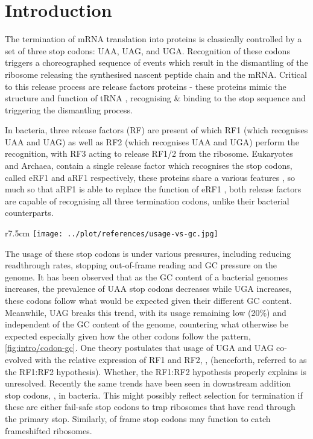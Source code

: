 \documentclass[../main.tex]{subfile}
\begin{document}
 \section{Introduction}
    The termination of mRNA translation into proteins is classically controlled by a set of three stop codons: UAA, UAG, and UGA. Recognition of these codons triggers a choreographed sequence of events which result in the dismantling of the ribosome releasing the synthesised nascent peptide chain and the mRNA. Critical to this release process are release factors proteins - these proteins mimic the structure and function of tRNA \autocite{Nakamura2003}, recognising \& binding to the stop sequence and triggering the dismantling process.

    In bacteria, three release factors (RF) are present of which RF1 (which recognises UAA and UAG) as well as RF2 (which recognises UAA and UGA) perform the recognition, with RF3 acting to release RF1/2 from the ribosome. Eukaryotes and Archaea, contain a single release factor which recognises the stop codons, called eRF1 and aRF1 respectively, these proteins share a various features \autocite{Alkalaeva2009}, so much so that aRF1 is able to replace the function of eRF1 \autocite{Dontsova2000}, both release factors are capable of recognising all three termination codons, unlike their bacterial counterparts.

    \begin{wrapfigure}{r}{7.5cm}
        \centering
        \texttt{[image: ../plot/references/usage-vs-gc.jpg]}
        \caption{Distribution of stop codon usage against GC of bacteria from \mancite\cite{Korkmaz2014}}
        \label{fig:intro/codon-gc}
    \end{wrapfigure}

    The usage of these stop codons is under various pressures, including reducing readthrough rates, stopping out-of-frame reading and GC pressure on the genome. It has been observed that as the GC content of a bacterial genomes increases, the prevalence of UAA stop codons decreases while UGA increases, these codons follow what would be expected given their different GC content. Meanwhile, UAG breaks this trend, with its usage remaining low (20\%) and independent of the GC content of the genome, countering what otherwise be expected especially given how the other codons follow the pattern, \cref{fig:intro/codon-gc}. One theory postulates that usage of UGA and UAG co-evolved with the relative expression of RF1 and RF2, \mancite\autocite{Korkmaz2014}, (henceforth, referred to as the RF1:RF2 hypothesis). Whether, the RF1:RF2 hypothesis properly explains is unresolved. Recently the same trends have been seen in downstream addition stop codons, \autocite{Ho2019}, in bacteria. This might possibly reflect selection for termination if these are either fail-safe stop codons to trap ribosomes that have read through the primary stop. Similarly, of frame stop codons may function to catch frameshifted ribosomes.
\end{document}
